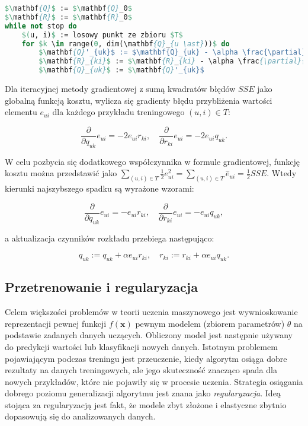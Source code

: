 \documentclass{pracamgr}
\begin{document}
\begin{lstlisting}[language=Pascal, mathescape=true,frame=single,caption={Metoda gradientowa rozkładu macierzy},captionpos=b]
$\mathbf{Q}$ := $\mathbf{Q}_0$
$\mathbf{R}$ := $\mathbf{R}_0$
while not stop do
    $(u, i)$ := losowy punkt ze zbioru $T$
    for $k \in range(0, dim(\mathbf{Q}_{u \ast}))$ do
        $\mathbf{Q}'_{uk}$ := $\mathbf{Q}_{uk} - \alpha \frac{\partial}{\partial \mathbf{Q}_{uk}} c(a_{ui}, \mathbf{Q}_{u \ast}, \mathbf{R}_{\ast i})$
        $\mathbf{R}_{ki}$ := $\mathbf{R}_{ki} - \alpha \frac{\partial}{\partial \mathbf{R}_{ki}} c(a_{ui}, \mathbf{Q}_{u \ast}, \mathbf{R}_{\ast i})$
        $\mathbf{Q}_{uk}$ := $\mathbf{Q}'_{uk}$

\end{lstlisting}

Dla iteracyjnej metody gradientowej z sumą kwadratów błędów $SSE$ jako globalną funkcją kosztu, wylicza się gradienty błędu przybliżenia wartości elementu $e_{ui}$ dla każdego przykładu treningowego $(u,i) \in T$:

\[
\frac{\partial}{\partial q_{uk}}e_{ui} = -2e_{ui} r_{ki}, \quad
\frac{\partial}{\partial r_{ki}}e_{ui} = -2e_{ui} q_{uk}.
\]

W celu pozbycia się dodatkowego współczynnika w formule gradientowej, funkcję kosztu można przedstawić jako $\sum_{(u,i) \in T} \frac{1}{2} e_{ui}^2 = \sum_{(u,i) \in T} \hat{e}_{ui} = \frac{1}{2} SSE$. Wtedy kierunki najszybszego spadku są wyrażone wzorami:

\[
\frac{\partial}{\partial q_{uk}}e_{ui} = -e_{ui} r_{ki}, \quad
\frac{\partial}{\partial r_{ki}}e_{ui} = -e_{ui} q_{uk},
\]

a aktualizacja czynników rozkładu przebiega następująco:

\[
q_{uk} := q_{uk} + \alpha e_{ui} r_{ki}, \quad
r_{ki} := r_{ki} + \alpha e_{ui} q_{uk}.
\]

\subsection{Przetrenowanie i regularyzacja}

Celem większości problemów w teorii uczenia maszynowego jest wywnioskowanie reprezentacji pewnej funkcji $f(\mathbf{x})$ pewnym modelem (zbiorem parametrów) $\theta$ na podstawie zadanych danych uczących. Obliczony model jest następnie używany do predykcji wartości lub klasyfikacji nowych danych. Istotnym problemem pojawiającym podczas treningu jest przeuczenie, kiedy algorytm osiąga dobre rezultaty na danych treningowych, ale jego skuteczność znacząco spada dla nowych przykładów, które nie pojawiły się w procesie uczenia. Strategia osiągania dobrego poziomu generalizacji algorytmu jest znana jako \textit{regularyzacja}. Ideą stojąca za regularyzacją jest fakt, że modele zbyt złożone i elastyczne zbytnio dopasowują się do analizowanych danych. 
\end{document}
